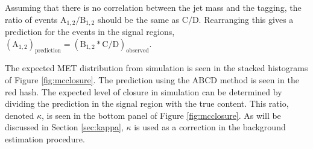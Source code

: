 Assuming that there is no correlation between the jet mass and the \bbbar tagging, the ratio of events $\mathrm{A}_{1, 2} / \mathrm{B}_{1, 2}$ should be the same as $\mathrm{C} / \mathrm{D}$. Rearranging this gives a prediction for the events in the signal regions, $\left(\mathrm{A}_{1, 2}\right)_{\mathrm{prediction}} = \left(\mathrm{B}_{1, 2} * \mathrm{C} / \mathrm{D}\right)_{\mathrm{observed}}$.

The expected MET distribution from simulation is seen in the stacked histograms of Figure \ref{fig:mcclosure}. The prediction using the ABCD method is seen in the red hash. The expected level of closure in simulation can be determined by dividing the prediction in the signal region with the true content. This ratio, denoted $\kappa$, is seen in the bottom panel of Figure \ref{fig:mcclosure}. As will be discussed in Section \ref{sec:kappa}, $\kappa$ is used as a correction in the background estimation procedure.

